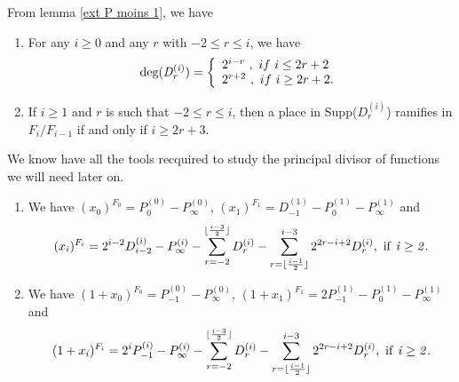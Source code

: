 \documentclass[10pt]{article}
\begin{document}
\s

From lemma \ref{ext P moins 1}, we have

\s

\begin{corollary} \label{deg et ram D_r}
\begin{enumerate}
\item For any $i \geq 0$ and any $r$ with $-2 \leq r \leq i$, we have 
\begin{equation}
\rm deg \it (D_r^{(i)}) = \left\{ \begin{array}{ll}
2^{i-r} \ , \ if \ i \leq 2r+2 \\
2^{r+2} \ , \ if \ i \geq 2r+2.
\end{array}
\right.
\end{equation}
\item If $i \geq 1$ and $r$ is such that $-2 \leq r \leq i$, then a place in \rm Supp($D_r^{(i)}$) ramifies in $F_i/F_{i-1}$ if and only if $i \geq 2r+3$.
\end{enumerate}
\end{corollary}

\s

We know have all the tools recquired to study the principal divisor of functions we will need later on. 

\s

\begin{proposition} \label{div principaux}
\begin{enumerate}
\item We have $(x_0)^{F_0} = P_0^{(0)} - P_{\infty}^{(0)}$, $(x_1)^{F_1} = D_{-1}^{(1)} - P_0^{(1)} - P_{\infty}^{(1)}$ and 
\begin{equation}
(x_i)^{F_i} = 2^{i-2}D_{i-2}^{(i)} - P_{\infty}^{(i)} - \sum\limits_{r=-2}^{\lfloor \frac{i-3}{2}\rfloor} D_r^{(i)} - \sum\limits_{r=\lfloor \frac{i-1}{2}\rfloor}^{i-3} 2^{2r-i+2}D_r^{(i)}, \ \rm if \it \ i\geq 2.
\end{equation}
\item We have $(1+x_0)^{F_0} = P_{-1}^{(0)} - P_{\infty}^{(0)}$, $(1+x_1)^{F_1} = 2P_{-1}^{(1)} - P_0^{(1)} - P_{\infty}^{(1)}$ and 
\begin{equation}
(1+x_i)^{F_i} = 2^{i}P_{-1}^{(i)} - P_{\infty}^{(i)} - \sum\limits_{r=-2}^{\lfloor \frac{i-3}{2}\rfloor} D_r^{(i)} - \sum\limits_{r=\lfloor \frac{i-1}{2}\rfloor}^{i-3} 2^{2r-i+2}D_r^{(i)}, \ \rm if \it \ i\geq 2.
\end{equation}
\end{enumerate}
\end{proposition}
\end{document}
